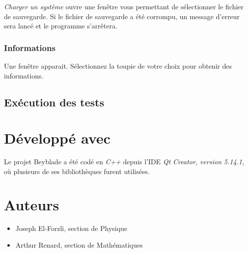 \documentclass[a4paper]{article}%
\begin{document}
			\emph {Charger un système} ouvre une fenêtre vous permettant de sélectionner le fichier de sauvegarde. Si le fichier de sauvegarde a été corrompu, un message d'erreur sera lancé et le programme s'arrêtera.
		\subsubsection {Informations}
			Une fenêtre apparait. Sélectionnez la toupie de votre choix pour obtenir des informations.
	\subsection {Exécution des tests}
\section{Développé avec}
	Le projet Beyblade a été codé en \emph{C++}  depuis l'IDE \emph{Qt Creator, version 5.14.1,} où plusieurs de ses bibliothèques furent utilisées.
	
\section {Auteurs}
	\begin{itemize}
		\item Joseph El-Forzli, section de Physique
		\item Arthur Renard, section de Mathématiques
	\end{itemize}
\end{document}
